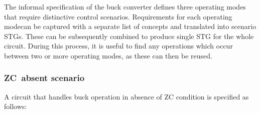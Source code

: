 \documentclass[british, journal]{IEEEtran}
\begin{document}
The informal specification of the buck converter defines three operating modes
that require distinctive control scenarios. Requirements for each operating modecan be captured with a separate list of concepts and translated into scenario
STGs. These can be subsequently combined to produce single STG for the whole
circuit.
During this process, it is useful to find any operations which occur
between two or more operating modes, as these can then be reused.

\subsubsection{ZC~absent scenario}

A circuit that handles buck operation in absence of ZC condition is specified as
follows:
\end{document}
